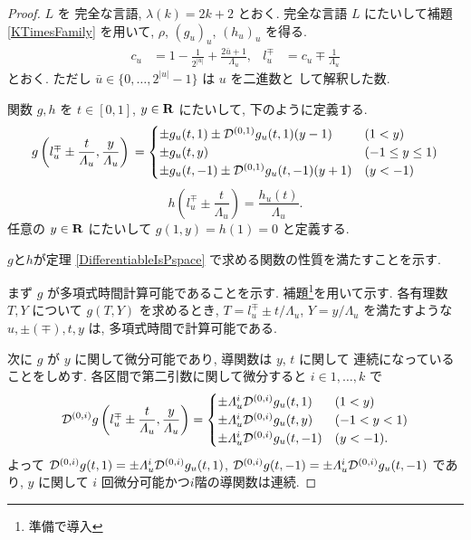 \begin{proof}
 $L$ を \PSPACE 完全な言語, $\lambda(k) = 2k+2$ とおく.
 \PSPACE 完全な言語 $L$ にたいして補題 \ref{KTimesFamily} を用いて,
 $\rho$, $(g_u)_u$, $(h_u)_u$ を得る.
 \begin{align}
  c_u &= 1-\frac{1}{2^|u|}+\frac{2\bar{u}+1}{\Lambda_u},&
   l_u^\mp &= c_u\mp\frac{1}{\varLambda_u}
 \end{align}
 とおく. ただし $\bar u \in \{0, \dots, 2^{|u|} - 1\}$ は $u$ を二進数と
 して解釈した数.

 関数 $g,h$ を $t \in [0,1]$, $y \in \mathbf R$ にたいして, 下のように定義する.
 \begin{equation}
  g\left(l^\mp_u \pm \frac{t}{\varLambda_u}, \frac{y}{\varLambda_u}\right) \\
   = \begin{cases}
      \pm g_u(t,1) \pm \mathcal D^{(0,1)}g_u(t, 1)(y-1) 
      &  (1<y) \\
      \pm g_u(t, y) 
      & (-1 \le y \le 1) \\
      \pm g_u(t, -1) \pm \mathcal D^{(0,1)} g_u(t, -1)(y+1)  & (y<-1)
     \end{cases}
 \end{equation}
 \begin{equation}
  h \left( l^\mp_u \pm \frac{t}{\Lambda_u} \right) 
   = \frac{h_u(t)}{\Lambda_u}.
 \end{equation}
 任意の $y\in \mathbf R$ にたいして $g(1,y) = h(1) = 0$ と定義する.

 $g$と$h$が定理 \ref{DifferentiableIsPspace} で求める関数の性質を満たすことを示す.
 
 まず $g$ が多項式時間計算可能であることを示す.
 補題\footnote{準備で導入}を用いて示す.
 各有理数 $T,Y$ について $g(T, Y)$ を求めるとき,
 $T=l_u^\mp \pm t/\Lambda_u$, $Y = y/\Lambda_u$ を満たすような
 $u, \pm(\mp), t, y$ は, 多項式時間で計算可能である.

 次に $g$ が $y$ に関して微分可能であり, 導関数は $y$, $t$ に関して
 連続になっていることをしめす. 
 各区間で第二引数に関して微分すると $i \in {1,\dots,k}$ で
 \begin{equation}
  \mathcal D^{(0,i)}g \left(l^\mp_u \pm \frac{t}{\varLambda_u}, \frac{y}{\varLambda_u} \right) = \begin{cases}
		   \pm \varLambda_u^i \mathcal D^{(0,i)}g_u(t,1) & (1 < y) \\
		   \pm \varLambda_u^i \mathcal D^{(0,i)}g_u(t,y) & (-1 < y < 1) \\
		   \pm \varLambda_u^i \mathcal D^{(0,i)}g_u(t,-1) & (y < -1).
		  \end{cases}
 \end{equation}
 よって $\mathcal D^{(0,i)}g(t, 1) = \pm \varLambda_u^i \mathcal D^{(0,i)}g_u (t,1)$, 
 $\mathcal D^{(0,i)}g(t, -1) = \pm \varLambda_u^i \mathcal D^{(0,i)}g_u (t,-1)$ であり,
 $y$ に関して $i$ 回微分可能かつ$i$階の導関数は連続.
 

\end{proof}
